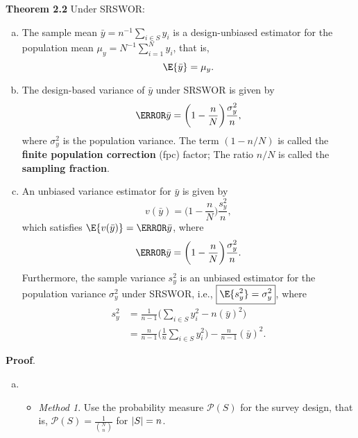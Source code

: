 \documentclass[oneside]{book}\usepackage[]{graphicx}\usepackage[svgnames]{xcolor}
\DeclarePairedDelimiter\abs{\lvert}{\rvert}
\begin{document}
\begin{Result}{}
      \textbf{Theorem 2.2} Under SRSWOR:
      \begin{enumerate}[(a)]
            \item The sample mean $ \bar{y}=n^{-1}\sum_{i\in S}y_i $
                  is a design-unbiased estimator for the population
                  mean $ \mu_y=N^{-1}\sum_{i=1}^{N}y_i $, that is,
                  \[ \E{\bar{y}}=\mu_y. \]
            \item The design-based variance of $ \bar{y} $
                  under SRSWOR is given by
                  \[ \V{\bar{y}}=\biggl(1-\frac{n}{N}\biggr)\frac{\sigma_y^2}{n}, \]
                  where $ \sigma_y^2 $ is the population variance. The term
                  $ (1-n/N) $ is called the \textbf{finite population correction} (fpc)
                  factor; The ratio $ n/N $ is called the \textbf{sampling fraction}.
            \item An unbiased variance estimator for $ \bar{y} $ is given by
                  \[ v(\bar{y})=\biggl(1-\frac{n}{N}\biggr)\frac{s_y^2}{n}, \]
                  which satisfies
                  $ \E{v(\bar{y})}=\V{\bar{y}} $,
                  where
                  \[ \V{\bar{y}}=\biggl(1-\frac{n}{N}\biggr)\frac{\sigma_y^2}{n}. \]
                  Furthermore, the sample variance $ s_y^2 $ is an unbiased estimator for the
                  population variance $ \sigma_y^2 $ under SRSWOR, i.e.,
                  $ \boxed{\E{s_y^2}=\sigma_y^2} $, where
                  \begin{align*}
                        s_y^2
                         & =\frac{1}{n-1}\biggl(\sum_{i\in S}y_i^2-n(\bar{y})^2\biggr) \\
                         & =\frac{n}{n-1}\biggl(\frac{1}{n}\sum_{i\in S}y_i^2\biggr)
                        -\frac{n}{n-1}(\bar{y})^2.
                  \end{align*}
      \end{enumerate}
      \tcblower{}
      \textbf{Proof}.
      \begin{enumerate}[(a)]
            \item \begin{itemize}
                        \item \emph{Method 1}. Use the probability measure $ \mathcal{P}(S) $
                              for the survey design, that is, $ \mathcal{P}(S)=\frac{1}{\binom{N}{n}} $
                              for $ \abs{S}=n $.


\end{itemize}
\end{enumerate}
\end{Result}
\end{document}
